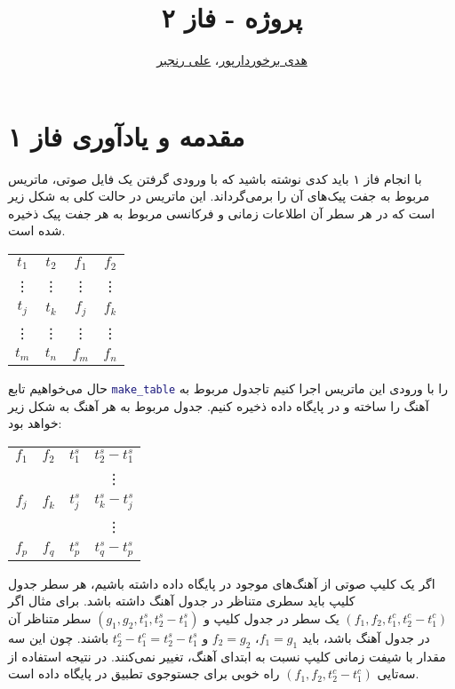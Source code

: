 \documentclass{utsignal}
\title{پروژه - فاز ۲}
\author{\href{mailto:h.barkhordarpour@ut.ac.ir?subject=[SS\%20S98 A2]}{هدی برخوردارپور}، 
\href{mailto:ranjbar.ali@ut.ac.ir?subject=[SS\%20S98 A2]\%20}{علی رنجبر}}
\begin{document}
	\maketitle
	\section*{مقدمه و یادآوری فاز ۱}
	با انجام فاز ۱ باید کدی نوشته باشید که با ورودی گرفتن یک فایل صوتی، ماتریس مربوط به جفت پیک‌های آن را برمی‌گرداند. این ماتریس در حالت کلی به شکل زیر است که در هر سطر آن اطلاعات زمانی و فرکانسی مربوط به هر جفت پیک ذخیره شده است.
	\begin{center}
		\begin{latin}
			\begin{tabular}{|c|c|c|c|}
				$t_1$ & $t_2$ & $f_1$ & $f_2$ \\
				\vdots&\vdots&\vdots&\vdots\\
				$t_j$ & $t_k$ & $f_j$ & $f_k$ \\
				\vdots&\vdots&\vdots&\vdots\\
				$t_m$ & $t_n$ & $f_m$ & $f_n$ \\
			\end{tabular}
		\end{latin}
	\end{center}
	حال می‌خواهیم تابع \lstinline[language=Matlab]{make_table} را با ورودی این ماتریس اجرا کنیم تاجدول مربوط به آهنگ را ساخته و در پایگاه داده ذخیره کنیم. جدول مربوط به هر آهنگ به شکل زیر خواهد بود:
	\begin{center}
		\begin{latin}
			\begin{tabular}{|c|c|c|c|}
				$f_1$ & $f_2$ & $t_1^s$ & $t_2^s-t_1^s$\\
				&&&\vdots\\
				$f_j$ & $f_k$ & $t_j^s$ & $t_k^s-t_j^s$\\
				&&&\vdots\\
				$f_p$ & $f_q$ & $t_p^s$ & $t_q^s-t_p^s$\\
			\end{tabular}
		\end{latin}
	\end{center}
	اگر یک کلیپ صوتی از آهنگ‌های موجود در پایگاه داده داشته باشیم، هر سطر جدول کلیپ باید سطری متناظر در جدول آهنگ داشته باشد. برای مثال اگر $(f_1, f_2, t_1^c, t_2^c-t_1^c)$ یک سطر در جدول کلیپ و $(g_1, g_2, t_1^s, t_2^s-t_1^s)$ سطر متناظر آن در جدول آهنگ باشد، باید $f_1=g_1$، $f_2=g_2$ و $t_2^c-t_1^c=t_2^s-t_1^s$ باشند. چون این سه مقدار با شیفت زمانی کلیپ نسبت به ابتدای آهنگ، تغییر نمی‌کنند. در نتیجه استفاده از سه‌تایی $(f_1, f_2, t_2^c-t_1^c)$ راه خوبی برای جستوجوی تطبیق در پایگاه داده است.
	
\end{document}
